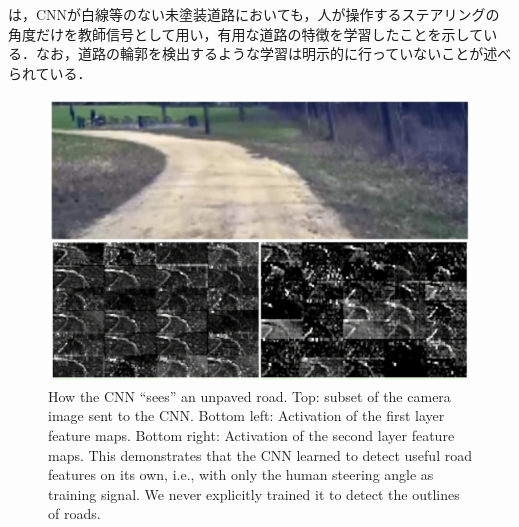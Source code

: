 \newpage

     は，CNNが白線等のない未塗装道路においても，人が操作するステアリングの角度だけを教師信号として用い，有用な道路の特徴を学習したことを示している．なお，道路の輪郭を検出するような学習は明示的に行っていないことが述べられている．

     \begin{figure}[h]
          \centering
          \includegraphics[keepaspectratio, scale=0.35] {images/bojarski_CNN.png}
          \captionsetup{justification=raggedright} %
          \caption{How the CNN ``sees'' an unpaved road. Top: subset of the camera image sent to the CNN. Bottom left: Activation of the first layer feature maps. Bottom right: Activation of the second layer feature maps. This demonstrates that the CNN learned to detect useful road features on its own, i.e., with only the human steering angle as training signal. We never explicitly trained it to detect the outlines of roads. \cite{bojarski}}
          \label{Fig:bojarski_CNN}
     \end{figure}

\newpage
